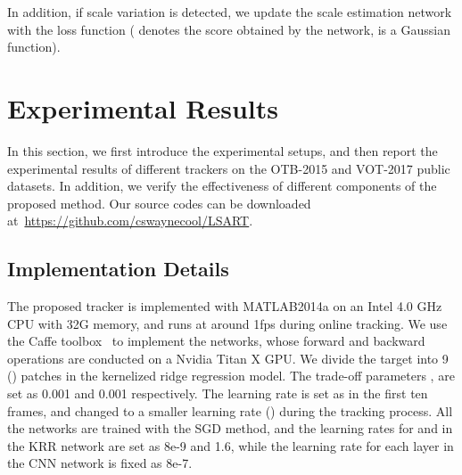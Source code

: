 \documentclass[10pt,twocolumn,letterpaper]{article}
\begin{document}
In addition, if scale variation is detected, we update the scale estimation network with the loss function  ( denotes
the score obtained by the network,  is a Gaussian function).

\vspace{1mm}
\section{Experimental Results}
In this section, we first introduce the experimental setups, and then report the experimental
results of different trackers on the OTB-2015 and VOT-2017 public datasets.
In addition, we verify the effectiveness of different components of the proposed method.
Our source codes can be downloaded at~\url{https://github.com/cswaynecool/LSART}.

\subsection{Implementation Details}
The proposed tracker is implemented with MATLAB2014a on an Intel 4.0 GHz CPU
with 32G memory, and runs at around 1fps during online tracking.
We use the Caffe toolbox~\cite{jia2014caffe} to implement the networks, whose
forward and backward operations are conducted on a Nvidia Titan X GPU.
We divide the target into 9 () patches in the kernelized ridge
regression model. The trade-off parameters , 
are set as 0.001 and 0.001 respectively.
The learning rate  is set as  in the first ten frames, and changed
to a smaller learning rate (\eg ) during the tracking process.
All the networks are trained with the SGD method, and the learning rates for
 and  in the KRR network are set as 8e-9 and
1.6, while the learning rate for each layer in the CNN network is fixed as
8e-7.
\end{document}

